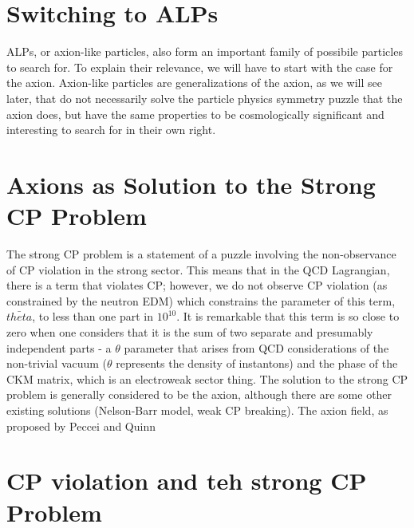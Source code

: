 \documentclass[12pt, twoside]{book}
\begin{document}
\section{Switching to ALPs}

ALPs, or axion-like particles, also form an important family of possibile particles to search for. To explain their relevance, we will have to start with the case for the axion. Axion-like particles are generalizations of the axion, as we will see later, that do not necessarily solve the particle physics symmetry puzzle that the axion does, but have the same properties to be cosmologically significant and interesting to search for in their own right.

\section{Axions as Solution to the Strong CP Problem}

The strong CP problem is a statement of a puzzle involving the non-observance of CP violation in the strong sector. This means that in the QCD Lagrangian, there is a term that violates CP; however, we do not observe CP violation (as constrained by the neutron EDM) which constrains the parameter of this term, $\bar{theta}$, to less than one part in $10^{10}$. It is remarkable that this term is so close to zero when one considers that it is the sum of two separate and presumably independent parts - a $\theta$ parameter that arises from QCD considerations of the non-trivial vacuum ($\theta$ represents the density of instantons) and the phase of the CKM matrix, which is an electroweak sector thing. The solution to the strong CP problem is generally considered to be the axion, although there are some other existing solutions (Nelson-Barr model, weak CP breaking). The axion field, as proposed by Peccei and Quinn



\section{ CP violation and teh strong CP Problem}
\end{document}
